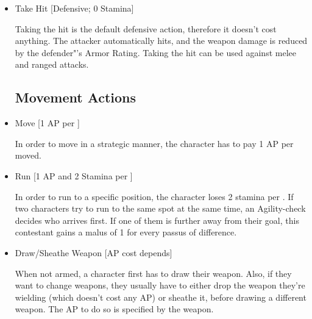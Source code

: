 \begin{itemize}
\item Take Hit [Defensive; 0 Stamina]

Taking the hit is the default defensive action, therefore it doesn't cost anything.
The attacker automatically hits, and the weapon damage is reduced by the defender"'s Armor Rating.
Taking the hit can be used against melee and ranged attacks.


\subsection{Movement Actions}

\item Move [1 AP per ]

In order to move in a strategic manner, the character has to pay 1 AP per  moved.


\item Run [1 AP and 2 Stamina per ]

In order to run to a specific position, the character loses 2 stamina per .
If two characters try to run to the same spot at the same time, an Agility-check decides who arrives first.
If one of them is further away from their goal, this contestant gains a malus of 1 for every passus of difference.


\item Draw/Sheathe Weapon [AP cost depends]

When not armed, a character first has to draw their weapon.
Also, if they want to change weapons, they usually have to either drop the weapon they're wielding (which doesn't cost any AP) or sheathe it, before drawing a different weapon.
The AP to do so is specified by the weapon.


\end{itemize}